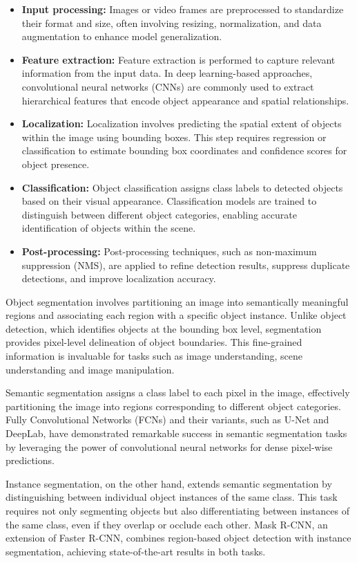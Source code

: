 \begin{itemize}
  \item \textbf{Input processing:} Images or video frames are preprocessed to standardize their format and size, often
involving resizing, normalization, and data augmentation to enhance model generalization.
  \item \textbf{Feature extraction:} Feature extraction is performed to capture relevant information from the input
  data. In deep learning-based approaches, convolutional neural networks (CNNs) are commonly used to extract hierarchical features that encode object appearance and spatial relationships.
  \item \textbf{Localization:} Localization involves predicting the spatial extent of objects within the image using
bounding boxes. This step requires regression or classification to estimate bounding box coordinates and confidence scores for object presence.
  \item \textbf{Classification:} Object classification assigns class labels to detected objects based on their visual
  appearance. Classification models are trained to distinguish between different object categories, enabling accurate identification of objects within the scene.
  \item \textbf{Post-processing:} Post-processing techniques, such as non-maximum suppression (NMS), are applied to
  refine detection results, suppress duplicate detections, and improve localization accuracy.
\end{itemize}

Object segmentation involves partitioning an image into semantically meaningful regions and associating each region
with a specific object instance. Unlike object detection, which identifies objects at the bounding box level, segmentation provides pixel-level delineation of object boundaries. This fine-grained information is invaluable for tasks such as image understanding, scene understanding and image manipulation.

Semantic segmentation assigns a class label to each pixel in the image, effectively partitioning the image into regions corresponding to different object categories. Fully Convolutional Networks (FCNs) and their variants, such as U-Net and DeepLab, have demonstrated remarkable success in semantic segmentation tasks by leveraging the power of convolutional neural networks for dense pixel-wise predictions.

Instance segmentation, on the other hand, extends semantic segmentation by distinguishing between individual object instances of the same class. This task requires not only segmenting objects but also differentiating between instances of the same class, even if they overlap or occlude each other. Mask R-CNN, an extension of Faster R-CNN, combines region-based object detection with instance segmentation, achieving state-of-the-art results in both tasks.

